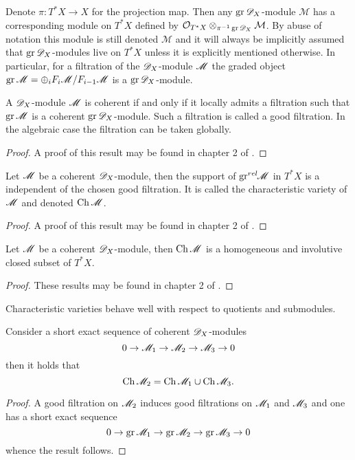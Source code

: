 Denote $\pi:T^*X \to X$ for the projection map.
Then any $\operatorname{gr}\mathscr{D}_X$-module $\mathcal{M}$ has a corresponding module on $T^* X$ defined by $\mathcal{O}_{T^*X} \otimes_{\pi^{-1}\operatorname{gr} \mathscr{D}_X} \mathcal{M}$.
By abuse of notation this module is still denoted $\mathcal{M}$ and it will always be implicitly assumed that $\operatorname{gr} \mathscr{D}_X$-modules live on $T^*X$ unless it is explicitly mentioned otherwise.
In particular, for a filtration of the $\mathscr{D}_X$-module $\mathscr{M}$ the graded object $\operatorname{gr} \mathscr{M} = \oplus_i F_i \mathscr{M} / F_{i-1}\mathscr{M}$ is a $\operatorname{gr} \mathscr{D}_X$-module.

\begin{proposition}\label{prop: GoodFiltration}
  A $\mathscr{D}_X$-module $\mathscr{M}$ is coherent if and only if it locally admits a filtration such that $\operatorname{gr} \mathscr{M}$ is a coherent $\operatorname{gr} \mathscr{D}_X$-module. Such a filtration is called a good filtration. In the algebraic case the filtration can be taken globally.
\end{proposition}
\begin{proof}
  A proof of this result may be found in chapter 2 of \cite{hotta2007d}.
\end{proof}
\begin{proposition}
  Let $\mathscr{M}$ be a coherent $\mathscr{D}_X$-module, then the support of $\operatorname{gr}^{rel}\mkern-5mu\mathscr{M}$ in $T^* X$ is a independent of the chosen good filtration. It is called the characteristic variety of $\mathscr{M}$ and denoted $\operatorname{Ch} \mathscr{M}$.
\end{proposition}
\begin{proof}
  A proof of this result may be found in chapter 2 of \cite{hotta2007d}.
\end{proof}
\begin{proposition}\label{prop: StructureChVar}
  Let $\mathscr{M}$ be a coherent $\mathscr{D}_X$-module, then $\operatorname{Ch} \mathscr{M}$ is a homogeneous and involutive closed subset of $T^* X$.
\end{proposition}
\begin{proof}
  These results may be found in chapter 2 of \cite{kashiwara2003d}.
\end{proof}
Characteristic varieties behave well with respect to quotients and submodules.
\begin{proposition}\label{prop: SESBehaviourChar}
  Consider a short exact sequence of coherent $\mathscr{D}_X$-modules
  $$0 \to \mathscr{M}_1 \to \mathscr{M}_2 \to \mathscr{M}_3 \to 0 $$
  then it holds that
  $$\operatorname{Ch} \mathscr{M}_2 = \operatorname{Ch} \mathscr{M}_1 \cup \operatorname{Ch} \mathscr{M}_3. $$
\end{proposition}
\begin{proof}
  A good filtration on $\mathscr{M}_2$ induces good filtrations on $\mathscr{M}_1$ and $\mathscr{M}_3$ and one has a short exact sequence
  $$0\to \operatorname{gr} \mathscr{M}_1 \to \operatorname{gr} \mathscr{M}_2 \to \operatorname{gr} \mathscr{M}_3 \to 0 $$
  whence the result follows.
\end{proof}
